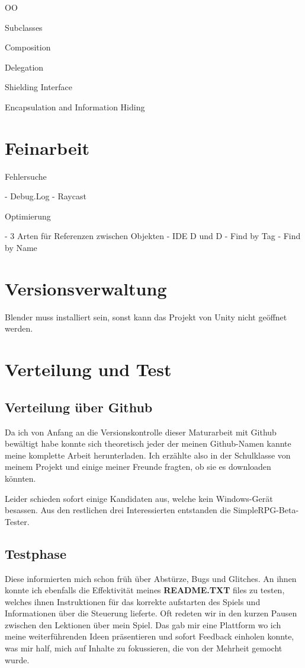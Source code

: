 
OO

Subclasses

Composition

Delegation

Shielding Interface

Encapsulation and Information Hiding


\section{Feinarbeit}

Fehlersuche

- Debug.Log
- Raycast

Optimierung

- 3 Arten für Referenzen zwischen Objekten
	- IDE D und D
	- Find by Tag
	- Find by Name

\section{Versionsverwaltung}


Blender muss installiert sein, sonst kann das Projekt von Unity nicht geöffnet werden.

\section{Verteilung und Test}

\subsection{Verteilung über Github}

Da ich von Anfang an die Versionskontrolle dieser Maturarbeit mit Github bewältigt habe konnte sich theoretisch jeder der meinen Github-Namen kannte meine komplette Arbeit herunterladen.\cite{csomormaturaarbeit19github}
Ich erzählte also in der Schulklasse von meinem Projekt und einige meiner Freunde fragten, ob sie es downloaden könnten.

Leider schieden sofort einige Kandidaten aus, welche kein Windows-Gerät besassen.
Aus den restlichen drei Interessierten entstanden die SimpleRPG-Beta-Tester.

\subsection{Testphase}

Diese informierten mich schon früh über Abstürze, Bugs und Glitches.
An ihnen konnte ich ebenfalls die Effektivität meines \textbf{README.TXT} files zu testen, welches ihnen Instruktionen für das korrekte aufstarten des Spiels und Informationen über die Steuerung lieferte.
Oft redeten wir in den kurzen Pausen zwischen den Lektionen über mein Spiel.
Das gab mir eine Plattform wo ich meine weiterführenden Ideen präsentieren und sofort Feedback einholen konnte, was mir half, mich auf Inhalte zu fokussieren, die von der Mehrheit gemocht wurde.


